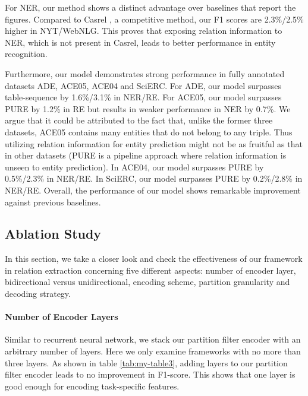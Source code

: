 \documentclass[11pt]{article}
\begin{document}
For NER, our method shows a distinct advantage over baselines that report the figures. Compared to Casrel \citep{wei-etal-2020-novel}, a competitive method, our F1 scores are 2.3\%/2.5\% higher in NYT/WebNLG. This proves that exposing relation information to NER, which is not present in Casrel, leads to better performance in entity recognition.

Furthermore, our model demonstrates strong performance in fully annotated datasets ADE, ACE05, ACE04 and SciERC. For ADE, our model surpasses table-sequence \citep{wang-lu-2020-two} by 1.6\%/3.1\% in NER/RE. For ACE05, our model surpasses PURE \citep{zhong2021frustratingly} by 1.2\% in RE but results in weaker performance in NER by 0.7\%. We argue that it could be attributed to the fact that, unlike the former three datasets, ACE05 contains many entities that do not belong to any triple. Thus utilizing relation information for entity prediction might not be as fruitful as that in other datasets (PURE is a pipeline approach where relation information is unseen to entity prediction). In ACE04, our model surpasses PURE by 0.5\%/2.3\% in NER/RE. In SciERC, our model surpasses PURE by 0.2\%/2.8\% in NER/RE. Overall, the performance of our model shows remarkable improvement against previous baselines.  


\subsection{Ablation Study}
In this section, we take a closer look and check the effectiveness of our framework in relation extraction concerning five different aspects: number of encoder layer, bidirectional versus unidirectional, encoding scheme, partition granularity and decoding strategy.  

\paragraph{Number of Encoder Layers}
Similar to recurrent neural network, we stack our partition filter encoder with an arbitrary number of layers. Here we only examine frameworks with no more than three layers. As shown in table \ref{tab:my-table3}, adding layers to our partition filter encoder leads to no improvement in F1-score. This shows that one layer is good enough for encoding task-specific features. 
\end{document}
